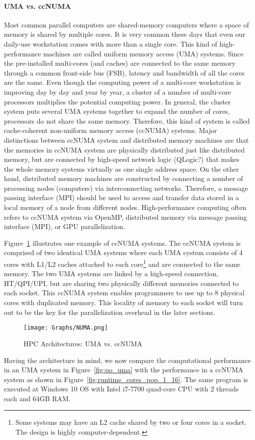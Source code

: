 \documentclass[12pt]{article}
\begin{document}
\paragraph{UMA vs. ccNUMA}
Most common parallel computers are shared-memory computers where a space of memory is shared by multiple cores. It is very common these days that even our daily-use workstation comes with more than a single core. This kind of high-performance machines are called uniform memory access (UMA) systems. Since the pre-installed multi-cores (and caches) are connected to the same memory through a common front-side bus (FSB), latency and bandwidth of all the cores are the same. Even though the computing power of a multi-core workstation is improving day by day and year by year, a cluster of a number of multi-core processors multiplies the potential computing power. In general, the cluster system puts several UMA systems together to expand the number of cores, processors do not share the same memory. Therefore, this kind of system is called cache-coherent non-uniform memory access (ccNUMA) systems. Major distinctions between ccNUMA system and distributed memory machines are that the memories in ccNUMA system are physically distributed just like distributed memory, but are connected by high-speed network logic (QLogic?) that makes the whole memory systems virtually as one single address space. On the other hand, distributed memory machines are constructed by connecting a number of processing nodes (computers) via interconnecting networks. Therefore, a message passing interface (MPI) should be used to access and transfer data stored in a local memory of a node from different nodes. High-performance computing often refers to ccNUMA system via OpenMP, distributed memory via message passing interface (MPI), or GPU parallelization.

Figure~\ref{fig:numa} illustrates one example of ccNUMA systems. The ccNUMA system is comprised of two identical UMA systems where each UMA system consists of 4 cores with L1/L2 caches attached to each core\footnote{\sf Some systems may have an L2 cache shared by two or four cores in a socket. The design is highly computer-dependent.} and are connected to the same memory. The two UMA systems are linked by a high-speed connection, HT/QPI/UPI, but are sharing two physically different memories connected to each socket. This ccNUMA system enables programmers to use up to 8 physical cores with duplicated memory. This locality of memory to each socket will turn out to be the key for the parallelization overhead in the later sections.
\begin{figure}[t!]
\begin{center}
\caption{\sf HPC Architectures: UMA vs. ccNUMA}
\texttt{[image: Graphs/NUMA.png]}\label{fig:numa}
\end{center}
\end{figure}
Having the architecture in mind, we now compare the computational performance in an UMA system in Figure~\ref{fig:po_uma} with the performance in a ccNUMA system as shown in Figure~\ref{fig:runtime_cores_pop_1_16}. The same program is executed at Windows 10 OS with Intel i7-7700 quad-core CPU with 2 threads each and 64GB RAM. 
\end{document}
